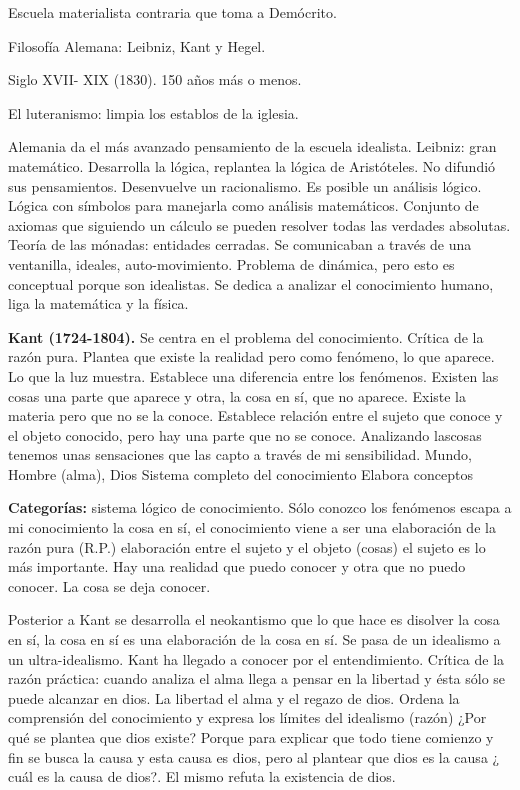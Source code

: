\documentclass[
  a4paper,
]{article}
\begin{document}
Escuela materialista contraria que toma a Demócrito.

Filosofía Alemana: Leibniz, Kant y Hegel.

Siglo XVII- XIX (1830). 150 años más o menos.

El luteranismo: limpia los establos de la iglesia.

Alemania da el más avanzado pensamiento de la escuela idealista.
Leibniz: gran matemático. Desarrolla la lógica, replantea la lógica de
Aristóteles. No difundió sus pensamientos. Desenvuelve un racionalismo.
Es posible un análisis lógico. Lógica con símbolos para manejarla como
análisis matemáticos. Conjunto de axiomas que siguiendo un cálculo se
pueden resolver todas las verdades absolutas. Teoría de las mónadas:
entidades cerradas. Se comunicaban a través de una ventanilla, ideales,
auto-movimiento. Problema de dinámica, pero esto es conceptual porque
son idealistas. Se dedica a analizar el conocimiento humano, liga la
matemática y la física.

\textbf{Kant (1724-1804).} Se centra en el problema del conocimiento.
Crítica de la razón pura. Plantea que existe la realidad pero como
fenómeno, lo que aparece. Lo que la luz muestra. Establece una
diferencia entre los fenómenos. Existen las cosas una parte que aparece
y otra, la cosa en sí, que no aparece. Existe la materia pero que no se
la conoce. Establece relación entre el sujeto que conoce y el objeto
conocido, pero hay una parte que no se conoce. Analizando lascosas
tenemos unas sensaciones que las capto a través de mi sensibilidad.
Mundo, Hombre (alma), Dios Sistema completo del conocimiento Elabora
conceptos

\textbf{Categorías:} sistema lógico de conocimiento. Sólo conozco los
fenómenos escapa a mi conocimiento la cosa en sí, el conocimiento viene
a ser una elaboración de la razón pura (R.P.) elaboración entre el
sujeto y el objeto (cosas) el sujeto es lo más importante. Hay una
realidad que puedo conocer y otra que no puedo conocer. La cosa se deja
conocer.

Posterior a Kant se desarrolla el neokantismo que lo que hace es
disolver la cosa en sí, la cosa en sí es una elaboración de la cosa en
sí. Se pasa de un idealismo a un ultra-idealismo. Kant ha llegado a
conocer por el entendimiento. Crítica de la razón práctica: cuando
analiza el alma llega a pensar en la libertad y ésta sólo se puede
alcanzar en dios. La libertad el alma y el regazo de dios. Ordena la
comprensión del conocimiento y expresa los límites del idealismo (razón)
¿Por qué se plantea que dios existe? Porque para explicar que todo tiene
comienzo y fin se busca la causa y esta causa es dios, pero al plantear
que dios es la causa ¿ cuál es la causa de dios?. El mismo refuta la
existencia de dios.
\end{document}

